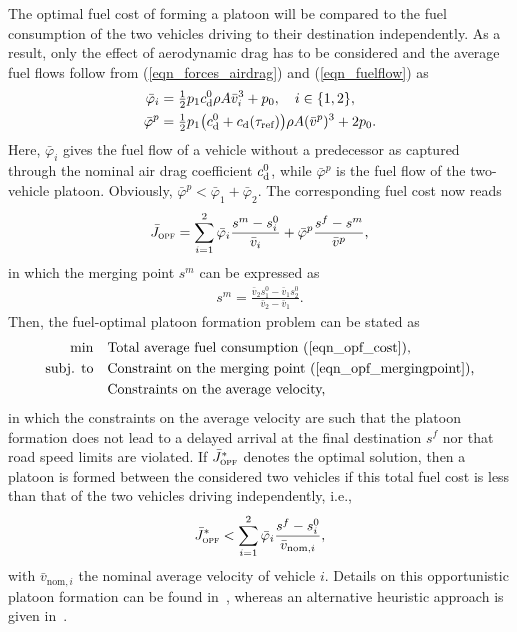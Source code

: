 \documentclass[journal]{IEEEtran}
\newcommand{\dtref}{\ensuremath{\tau_{\text{\rm ref}}}}
\begin{document}
The optimal fuel cost of forming a platoon will be compared to the fuel consumption of the two vehicles driving to their destination independently. As a result, only the effect of aerodynamic drag has to be considered and the average fuel flows follow from (\ref{eqn_forces_airdrag}) and (\ref{eqn_fuelflow}) as
\begin{align}
\bar{\varphi}_i &= \tfrac{1}{2} p_1 c_{\text{\rm d}}^0\rho A\bar{v}_i^3 + p_0, \quad i\in\{1,2\},\label{eqn_opf_fuelflow_vehicle}\\
\bar{\varphi}^p &= \tfrac{1}{2}p_1 \big( c_{\text{\rm d}}^0 + c_{\text{\rm d}}(\dtref) \big)\rho A (\bar{v}^p)^3 + 2p_0. \label{eqn_opf_fuelflow_platoon}
\end{align}
Here, $\bar{\varphi}_i$ gives the fuel flow of a vehicle without a predecessor as captured through the nominal air drag coefficient $c_{\text{\rm d}}^0$, while $\bar{\varphi}^p$ is the fuel flow of the two-vehicle platoon. Obviously, $\bar{\varphi}^p<\bar{\varphi}_1 + \bar{\varphi}_2$. The corresponding fuel cost now reads
\begin{align}
\bar{J}_{\textsc{opf}} = \sum_{i=1}^2 \bar{\varphi}_i\frac{s^m - s_i^0}{\bar{v}_i} + \bar{\varphi}^p\frac{s^f - s^m}{\bar{v}^p},
\label{eqn_opf_cost}
\end{align}
in which the merging point $s^m$ can be expressed as
\begin{align}
s^m = \frac{\bar{v}_2s_1^0 - \bar{v}_1s_2^0}{\bar{v}_2 - \bar{v}_1}.
\label{eqn_opf_mergingpoint}
\end{align}
Then, the fuel-optimal platoon formation problem can be stated as
\begin{equation}
\begin{aligned}
\min \quad & \text{Total average fuel consumption (\ref{eqn_opf_cost}),} \\
\text{subj. to} \quad
& \text{Constraint on the merging point (\ref{eqn_opf_mergingpoint}),} \\
& \text{Constraints on the average velocity,} \\
\end{aligned}
\nonumber
\end{equation}
in which the constraints on the average velocity are such that the platoon formation does not lead to a delayed arrival at the final destination $s^f$ nor that road speed limits are violated. If $\bar{J}_{\textsc{opf}}^*$ denotes the optimal solution, then a platoon is formed between the considered two vehicles if this total fuel cost is less than that of the two vehicles driving independently, i.e.,
\begin{align}
\bar{J}_{\textsc{opf}}^* < \sum_{i=1}^2 \bar{\varphi}_i \frac{s^f - s_i^0}{\bar{v}_{\text{nom},i}},
\end{align}
with $\bar{v}_{\text{nom},i}$ the nominal average velocity of vehicle $i$. Details on this opportunistic platoon formation can be found in~\cite{Liang2015}, whereas an alternative heuristic approach is given in~\cite{larson_2015}.
\end{document}
